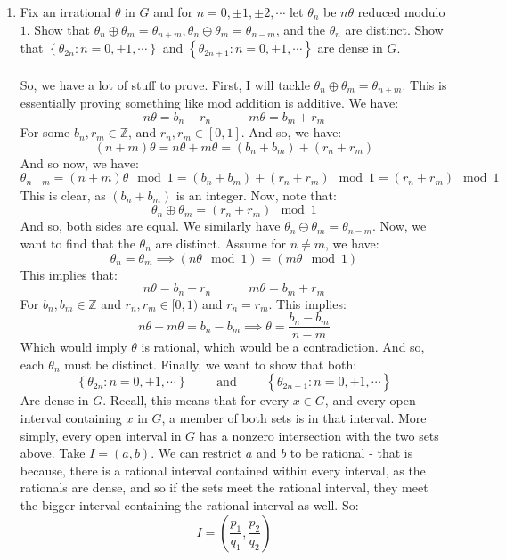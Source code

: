\documentclass[12pt,a4paper]{article}
\newcommand{\1}[1]{\mathbbm{1}\left\{ #1 \right\}}
\newcommand{\Z}{\mathbb{Z}}
\begin{document}
\begin{enumerate}
	\item Fix an irrational $\theta$ in $G$ and for $n = 0, \pm 1, \pm 2, \cdots$ let $\theta_n$ be $n\theta$ reduced modulo $1$. Show that $\theta_n \oplus \theta_m = \theta_{n + m}, \theta_n \ominus \theta_m = \theta_{n-m}$, and the $\theta_n$ are distinct. Show that $\left\{\theta_{2n} : n = 0, \pm 1, \cdots\right\}$ and $\left\{\theta_{2n + 1} : n = 0, \pm 1, \cdots\right\}$ are dense in $G$.
	\\\\
	So, we have a lot of stuff to prove. First, I will tackle $\theta_n \oplus \theta_m = \theta_{n + m}$. This is essentially proving something like mod addition is additive. We have:
	$$
		n\theta = b_n + r_n \quad\quad\quad
		m\theta = b_m + r_m
	$$
	For some $b_n,r_m \in \Z$, and $r_n,r_m \in [0,1]$. And so, we have:
	$$
		(n + m)\theta = n\theta + m\theta = (b_n + b_m) + (r_n + r_m)
	$$
	And so now, we have:
	$$
		\theta_{n + m} = (n + m)\theta \mod 1 = (b_n + b_m) + (r_n + r_m) \mod 1 = (r_n + r_m) \mod 1
	$$
	This is clear, as $(b_n + b_m)$ is an integer. Now, note that:
	$$
		\theta_n \oplus \theta_m = (r_n + r_m) \mod 1
	$$
	And so, both sides are equal. We similarly have $\theta_n \ominus \theta_m = \theta_{n-m}$. Now, we want to find that the $\theta_n$ are distinct. Assume for $n \neq m$, we have:
	$$
		\theta_n = \theta_m \implies
		(n\theta \mod 1) = (m\theta \mod 1)
	$$
	This implies that:
	$$
		n\theta = b_n + r_n \quad\quad\quad m\theta = b_m + r_m
	$$
	For $b_n,b_m \in \Z$ and $r_n,r_m \in [0,1)$ and $r_n = r_m$. This implies:
	$$
		n\theta - m\theta = b_n - b_m \implies
		\theta = \frac{b_n - b_m}{n - m}
	$$
	Which would imply $\theta$ is rational, which would be a contradiction. And so, each $\theta_n$ must be distinct. Finally, we want to show that both:
	$$
		\left\{\theta_{2n} : n = 0, \pm 1, \cdots\right\} \quad\quad\text{ and }\quad\quad
		\left\{\theta_{2n + 1} : n = 0, \pm 1, \cdots\right\}
	$$
	Are dense in $G$. Recall, this means that for every $x \in G$, and every open interval containing $x$ in $G$, a member of both sets is in that interval. More simply, every open interval in $G$ has a nonzero intersection with the two sets above. Take $I = (a,b)$. We can restrict $a$ and $b$ to be rational - that is because, there is a rational interval contained within every interval, as the rationals are dense, and so if the sets meet the rational interval, they meet the bigger interval containing the rational interval as well. So:
	$$
		I = \left(\frac{p_1}{q_1}, \frac{p_2}{q_2}\right)
$$
\end{enumerate}
\end{document}
